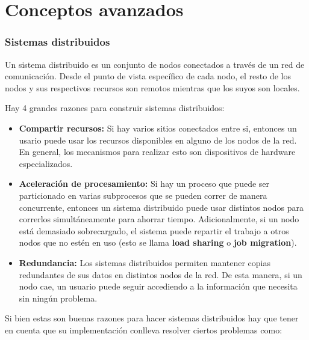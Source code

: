\part{Conceptos avanzados}

\section{Sistemas distribuidos}

Un sistema distribuido es un conjunto de nodos conectados a través de un red de comunicación. Desde el punto de vista específico de cada nodo, el resto de los nodos y sus respectivos recursos son remotos mientras que los suyos son locales.

Hay 4 grandes razones para construir sistemas distribuidos: 

\begin{itemize}
	\item\textbf{Compartir  recursos:} Si hay varios sitios conectados entre si, entonces un usario puede usar los recursos disponibles en alguno de los nodos de la red. En general, los mecanismos para realizar esto son dispositivos de hardware especializados.
	\item\textbf{Aceleración de procesamiento:} Si hay un proceso que puede ser particionado en varias subprocesos que se pueden correr de manera concurrente, entonces un sistema distribuido puede usar distintos nodos para correrlos simultáneamente para ahorrar tiempo. Adicionalmente, si un nodo está demasiado sobrecargado, el sistema puede repartir el trabajo a otros nodos que no estén en uso (esto se llama \textbf{load sharing} o \textbf{job migration}).
	\item\textbf{Redundancia:} Los sistemas distribuidos permiten mantener copias redundantes de sus datos en distintos nodos de la red. De esta manera, si un nodo cae, un usuario puede seguir accediendo a la información que necesita sin ningún problema.
\end{itemize}

Si bien estas son buenas razones para hacer sistemas distribuidos hay que tener en cuenta que su implementación conlleva resolver ciertos problemas como:

